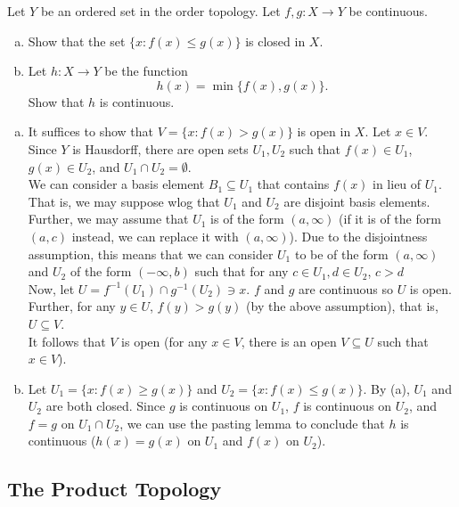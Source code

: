	\setcounter{exercise}{7}
	\begin{exercise}
		Let $Y$ be an ordered set in the order topology. Let $f,g:X\to Y$ be continuous.
		\begin{enumerate}[(a)]
			\item Show that the set $\{x : f(x)\leq g(x)\}$ is closed in $X$.
			\item Let $h:X\to Y$ be the function
			\[ h(x) = \min\{f(x),g(x)\}. \]
			Show that $h$ is continuous.
		\end{enumerate}
	\end{exercise}
	\begin{solution*}
		\begin{enumerate}[(a)]
			\item It suffices to show that $V = \{x : f(x) > g(x)\}$ is open in $X$. Let $x\in V$. Since $Y$ is Hausdorff, there are open sets $U_1, U_2$ such that $f(x)\in U_1$, $g(x)\in U_2$, and $U_1\cap U_2 = \emptyset$.\\
			We can consider a basis element $B_1\subseteq U_1$ that contains $f(x)$ in lieu of $U_1$. That is, we may suppose wlog that $U_1$ and $U_2$ are disjoint basis elements. Further, we may assume that $U_1$ is of the form $(a,\infty)$ (if it is of the form $(a,c)$ instead, we can replace it with $(a,\infty)$). Due to the disjointness assumption, this means that we can consider $U_1$ to be of the form $(a,\infty)$ and $U_2$ of the form $(-\infty,b)$ such that for any $c\in U_1, d\in U_2$, $c>d$\\
			Now, let $U=f^{-1}(U_1)\cap g^{-1}(U_2)\ni x$. $f$ and $g$ are continuous so $U$ is open. Further, for any $y\in U$, $f(y)>g(y)$ (by the above assumption), that is, $U\subseteq V$.\\
			It follows that $V$ is open (for any $x\in V$, there is an open $V\subseteq U$ such that $x\in V$).

			\item Let $U_1 = \{x : f(x) \geq g(x)\}$ and $U_2 = \{x : f(x) \leq g(x)\}$. By (a), $U_1$ and $U_2$ are both closed. Since $g$ is continuous on $U_1$, $f$ is continuous on $U_2$, and $f=g$ on $U_1\cap U_2$, we can use the pasting lemma to conclude that $h$ is continuous ($h(x)=g(x)$ on $U_1$ and $f(x)$ on $U_2$).
		\end{enumerate}
	\end{solution*}


\subsection{The Product Topology}

